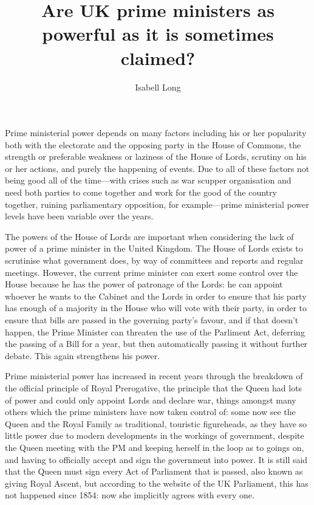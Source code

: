 \documentclass[a4paper]{article}
\begin{document}
\title{Are UK prime ministers as powerful as it is sometimes claimed?}
\author{Isabell Long}
\maketitle

Prime ministerial power depends on many factors including his or her popularity both with the electorate and the opposing party in the House of Commons, the strength or preferable weakness or laziness of the House of Lords, scrutiny on his or her actions, and purely the happening of events.  Due to all of these factors not being good all of the time---with crises such as war scupper organisation and need both parties to come together and work for the good of the country together, ruining parliamentary opposition, for example---prime ministerial power levels have been variable over the years.

The powers of the House of Lords are important when considering the lack of power of a prime minister in the United Kingdom.  The House of Lords exists to scrutinise what government does, by way of committees and reports and regular meetings.  However, the current prime minister can exert some control over the House because he has the power of patronage of the Lords: he can appoint whoever he wants to the Cabinet and the Lords in order to ensure that his party has enough of a majority in the House who will vote with their party, in order to ensure that bills are passed in the governing party's favour, and if that doesn't happen, the Prime Minister can threaten the use of the Parliment Act, deferring the passing of a Bill for a year, but then automatically passing it without further debate.  This again strengthens his power.

Prime ministerial power has increased in recent years through the breakdown of the official principle of Royal Prerogative, the principle that the Queen had lots of power and could only appoint Lords and declare war, things amongst many others which the prime ministers have now taken control of: some now see the Queen and the Royal Family as traditional, touristic figureheads, as they have so little power due to modern developments in the workings of government, despite the Queen meeting with the PM and keeping herself in the loop as to goings on, and having to officially accept and sign the government into power.  It is still said that the Queen must sign every Act of Parliament that is passed, also known as giving Royal Ascent, but according to the website of the UK Parliament, this has not happened since 1854: now she implicitly agrees with every one.
\end{document}
